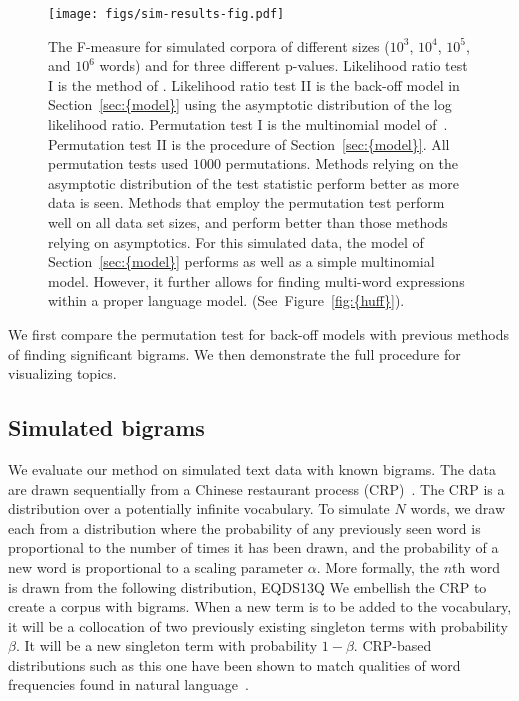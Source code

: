 \documentclass[11pt]{article}
\begin{document}
\begin{figure*}[t]
   \texttt{[image: figs/sim-results-fig.pdf]}
   \caption{\label{fig:f-measure} The F-measure for simulated corpora
     of different sizes ($10^3$, $10^4$, $10^5$, and $10^6$ words) and
     for three different p-values.  Likelihood ratio test I is the
     method of \cite{Dunning:1993}.  Likelihood ratio test II is the
     back-off model in {Section~\ref{sec:{model}}} using the asymptotic distribution
     of the log likelihood ratio.  Permutation test I is the
     multinomial model of~\cite{Pedersen:1996}.  Permutation test II
     is the procedure of {Section~\ref{sec:{model}}}.  All permutation tests used
     $1000$ permutations.  Methods relying on the asymptotic
     distribution of the test statistic perform better as more data is
     seen.  Methods that employ the permutation test perform well on
     all data set sizes, and perform better than those methods relying
     on asymptotics.  For this simulated data, the model of
     {Section~\ref{sec:{model}}} performs as well as a simple multinomial
     model. However, it further allows for finding multi-word
     expressions within a proper language model.  (See~{Figure~\ref{fig:{huff}}}).}
\end{figure*}

\label{sec:results}

We first compare the permutation test for back-off models with
previous methods of finding significant bigrams.  We then demonstrate
the full procedure for visualizing topics.

\subsection{Simulated bigrams}

We evaluate our method on simulated text data with known bigrams.  The
data are drawn sequentially from a Chinese restaurant process
(CRP)~\citep{Pitman:2002}.  The CRP is a distribution over a
potentially infinite vocabulary.  To simulate $N$ words, we draw each
from a distribution where the probability of any previously seen word
is proportional to the number of times it has been drawn, and the
probability of a new word is proportional to a scaling parameter
$\alpha$.  More formally, the $n$th word is drawn from the following
distribution,
EQDS13Q
We embellish the CRP to create a corpus with bigrams.  When a new term
is to be added to the vocabulary, it will be a collocation of two
previously existing singleton terms with probability $\beta$.  It will
be a new singleton term with probability $1-\beta$.  CRP-based
distributions such as this one have been shown to match qualities of
word frequencies found in natural language~\cite{Goldwater:2006a}.
\end{document}
